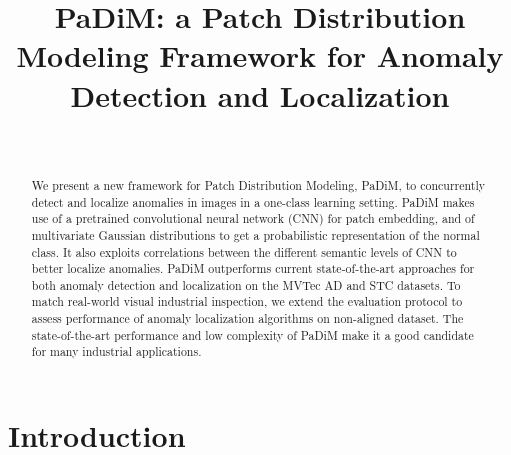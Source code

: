 \documentclass[a4paper,conference]{IEEEtran}
\begin{document}
\title{PaDiM: a Patch Distribution Modeling Framework for Anomaly Detection and Localization}

\author{
\\
}
    














\maketitle

\begin{abstract}
We present a new framework for Patch  Distribution Modeling, PaDiM, to concurrently detect and localize anomalies in images in a one-class learning setting. PaDiM makes use of a pretrained convolutional neural network (CNN) for patch embedding, and of multivariate Gaussian distributions to get a probabilistic representation of the normal class. It also exploits correlations between the different semantic levels of CNN to better localize anomalies. PaDiM outperforms current state-of-the-art approaches for both  anomaly detection and localization on the MVTec AD and STC datasets.
To match real-world visual industrial inspection, we extend the evaluation protocol to assess performance of anomaly localization algorithms on non-aligned dataset. 
The state-of-the-art performance and low complexity of PaDiM make it a good candidate for many industrial applications.  






\end{abstract}






\IEEEpeerreviewmaketitle

\section{Introduction}
\end{document}
